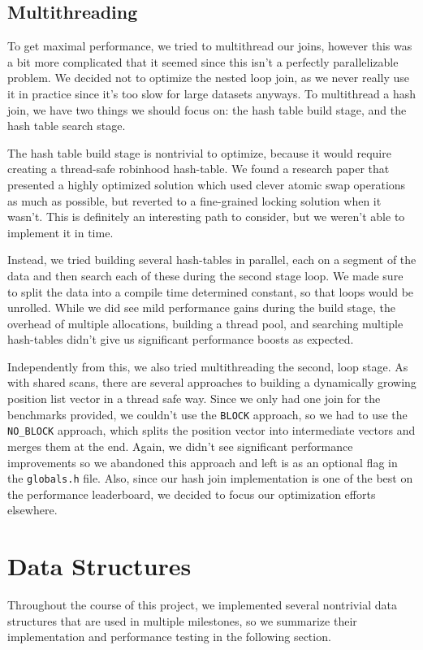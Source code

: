\documentclass[a4paper, 12pt]{article}
\begin{document}
\subsection{Multithreading}

To get maximal performance, we tried to multithread our joins, however this was a bit more complicated that it seemed since this isn't a perfectly parallelizable problem. We decided not to optimize the nested loop join, as we never really use it in practice since it's too slow for large datasets anyways. To multithread a hash join, we have two things we should focus on: the hash table build stage, and the hash table search stage.

\medskip
The hash table build stage is nontrivial to optimize, because it would require creating a thread-safe robinhood hash-table. We found a research paper that presented a highly optimized solution which used clever atomic swap operations as much as possible, but reverted to a fine-grained locking solution when it wasn't. This is definitely an interesting path to consider, but we weren't able to implement it in time.

\medskip
Instead, we tried building several hash-tables in parallel, each on a segment of the data and then search each of these during the second stage loop. We made sure to split the data into a compile time determined constant, so that loops would be unrolled. While we did see mild performance gains during the build stage, the overhead of multiple allocations, building a thread pool, and searching multiple hash-tables didn't give us significant performance boosts as expected.

\medskip
Independently from this, we also tried multithreading the second, loop stage. As with shared scans, there are several approaches to building a dynamically growing position list vector in a thread safe way. Since we only had one join for the benchmarks provided, we couldn't use the \texttt{BLOCK} approach, so we had to use the \texttt{NO\_BLOCK} approach, which splits the position vector into intermediate vectors and merges them at the end. Again, we didn't see significant performance improvements so we abandoned this approach and left is as an optional flag in the \texttt{globals.h} file. Also, since our hash join implementation is one of the best on the performance leaderboard, we decided to focus our optimization efforts elsewhere.

\section{Data Structures}
Throughout the course of this project, we implemented several nontrivial data structures that are used in multiple milestones, so we summarize their implementation and performance testing in the following section.
\end{document}
